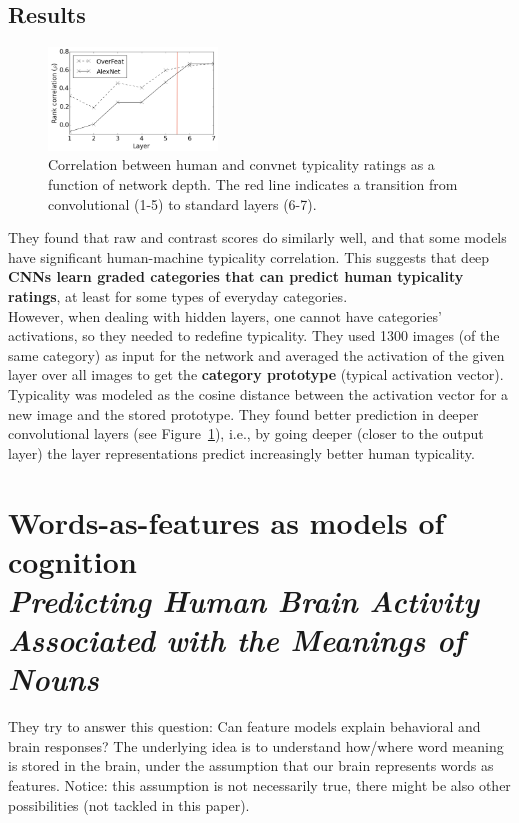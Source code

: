 \subsection{Results}
\begin{figure}
  \centering
  \includegraphics[width=0.4\textwidth]{images/lake.png}
  \caption{Correlation between human and convnet typicality ratings as a function of network depth. The red line indicates a transition from convolutional (1-5) to standard layers (6-7).}
  \label{fig:lake}
\end{figure}

They found that raw and contrast scores do similarly well, and that some models have significant human-machine typicality correlation. This suggests that deep \textbf{CNNs learn graded categories that can predict human typicality ratings}, at least for some types of everyday categories.\\

However, when dealing with hidden layers, one cannot have categories' activations, so they needed to redefine typicality.
They used 1300 images (of the same category) as input for the network and averaged the activation of the given layer over all images to get the \textbf{category prototype} (typical activation vector).
Typicality was modeled as the cosine distance between the activation vector for a new image and the stored prototype. They found better prediction in deeper convolutional layers (see Figure~\ref{fig:lake}), i.e., by going deeper (closer to the output layer) the layer representations predict increasingly better human typicality.


\section[Words-as-features as models of cognition]{Words-as-features as models of cognition\\ \large{\textit{Predicting Human Brain Activity Associated with the Meanings of Nouns}\\ \cite{Mitchell2008PredictingHB}}}
They try to answer this question: Can feature models explain behavioral and brain responses?
The underlying idea is to understand how/where word meaning is stored in the brain, under the assumption that our brain represents words as features. Notice: this assumption is not necessarily true, there might be also other possibilities (not tackled in this paper).

